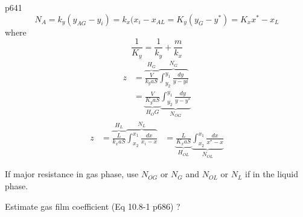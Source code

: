 \documentclass[11pt]{article}
\begin{document}
p641
\[N_A = k_y (y_{AG}-y_i) = k_x(x_i-x_{AL} = K_y(y_G-y^*) = K_x{x^*-x_L}\]
where
\[\frac{1}{K_y} = \frac{1}{k_y} + \frac{m}{k_x}\]
\begin{align}
z &= \overbrace{\frac{V}{k_y a S}}^{H_G}
     \overbrace{\int_{y_2}^{y_1}\frac{dy}{y-yi}}^{N_G}\\
  &= \underbrace{\frac{V}{K_y a S}}_{H_OG}
     \underbrace{\int_{y_2}^{y_1}\frac{dy}{y-y^*}}_{N_{OG}}
\end{align}
\begin{align}
z &= \overbrace{\frac{L}{k_x a S}}^{H_L}
     \overbrace{\int_{x_2}^{x_1}\frac{dx}{x_i-x}}^{N_L}
  &= \underbrace{\frac{L}{K_x a S}}_{H_{OL}}
     \underbrace{\int_{x_2}^{x_1}\frac{dx}{x^*-x}}_{N_{OL}}
\end{align}

If major resistance in gas phase, use $N_{OG}$ or $N_G$ and $N_{OL}$ or $N_L$ if in the liquid phase.

Estimate gas film coefficient (Eq 10.8-1 p686)
?
\end{document}
